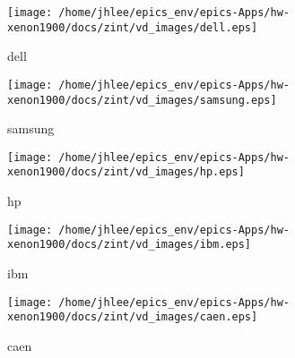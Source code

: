 \noindent
\vspace{1.4cm}
\begin{minipage}{.2\textwidth}
\begin{center}
\texttt{[image: /home/jhlee/epics\_env/epics-Apps/hw-xenon1900/docs/zint/vd\_images/dell.eps]}
\end{center}
\end{minipage}
\begin{minipage}{.7\textwidth}
dell
\end{minipage}


\noindent
\vspace{1.4cm}
\begin{minipage}{.2\textwidth}
\begin{center}
\texttt{[image: /home/jhlee/epics\_env/epics-Apps/hw-xenon1900/docs/zint/vd\_images/samsung.eps]}
\end{center}
\end{minipage}
\begin{minipage}{.7\textwidth}
samsung
\end{minipage}


\noindent
\vspace{1.4cm}
\begin{minipage}{.2\textwidth}
\begin{center}
\texttt{[image: /home/jhlee/epics\_env/epics-Apps/hw-xenon1900/docs/zint/vd\_images/hp.eps]}
\end{center}
\end{minipage}
\begin{minipage}{.7\textwidth}
hp
\end{minipage}


\noindent
\vspace{1.4cm}
\begin{minipage}{.2\textwidth}
\begin{center}
\texttt{[image: /home/jhlee/epics\_env/epics-Apps/hw-xenon1900/docs/zint/vd\_images/ibm.eps]}
\end{center}
\end{minipage}
\begin{minipage}{.7\textwidth}
ibm
\end{minipage}


\noindent
\vspace{1.4cm}
\begin{minipage}{.2\textwidth}
\begin{center}
\texttt{[image: /home/jhlee/epics\_env/epics-Apps/hw-xenon1900/docs/zint/vd\_images/caen.eps]}
\end{center}
\end{minipage}
\begin{minipage}{.7\textwidth}
caen
\end{minipage}


